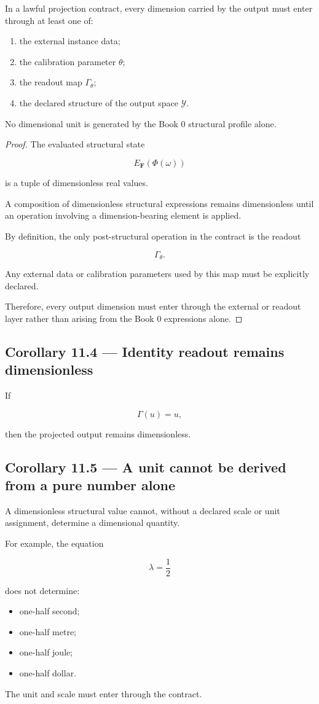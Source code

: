 \documentclass[11pt,oneside,openany]{book}
\newcommand{\PCsubsection}[1]{%
  \subsection*{#1}%
}
\begin{document}
In a lawful projection contract, every dimension carried by the output must enter through at least one of:

\begin{enumerate}
\item the external instance data;
\item the calibration parameter \(\theta\);
\item the readout map \(\Gamma_\theta\);
\item the declared structure of the output space \(\mathcal Y\).
\end{enumerate}
No dimensional unit is generated by the Book 0 structural profile alone.

\begin{proof}
The evaluated structural state

\[
E_{\mathbf F}(\Phi(\omega))
\]

is a tuple of dimensionless real values.

A composition of dimensionless structural expressions remains dimensionless until an operation involving a dimension-bearing element is applied.

By definition, the only post-structural operation in the contract is the readout

\[
\Gamma_\theta.
\]

Any external data or calibration parameters used by this map must be explicitly declared.

Therefore, every output dimension must enter through the external or readout layer rather than arising from the Book 0 expressions alone.

\end{proof}

\PCsubsection{Corollary 11.4 --- Identity readout remains dimensionless}

If

\[
\Gamma(u)=u,
\]

then the projected output remains dimensionless.

\PCsubsection{Corollary 11.5 --- A unit cannot be derived from a pure number alone}

A dimensionless structural value cannot, without a declared scale or unit assignment, determine a dimensional quantity.

For example, the equation

\[
\lambda=\frac12
\]

does not determine:

\begin{itemize}
\item one-half second;
\item one-half metre;
\item one-half joule;
\item one-half dollar.
\end{itemize}
The unit and scale must enter through the contract.
\end{document}

